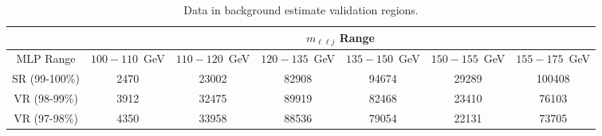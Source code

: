 \documentclass[NOTE, atlasdraft=true, texlive=2017, UKenglish]{\ATLASLATEXPATH atlasdoc}
\begin{document}

\begin{table}[!htbp]{\footnotesize\renewcommand{\arraystretch}{1.2}
    \begin{center}
      \begin{tabular}{c|c|c|c|c|c|c|}
        \cline{2-7}
        & \multicolumn{6}{|c|}{$m_{\ell\ell j}$ Range}\\
        \hline
        \multicolumn{1}{|c|}{MLP Range} & $100-110$~GeV & $110-120$~GeV & $120-135$~GeV & $135-150$~GeV & $150-155$~GeV & $155-175$~GeV \\
        \hline
        \multicolumn{1}{|c|}{SR (99-100\%)} & 2470 & 23002 & 82908 & 94674 & 29289 & 100408 \\
        \multicolumn{1}{|c|}{VR (98-99\%)} & 3912 & 32475 & 89919 & 82468 & 23410 & 76103 \\
        \multicolumn{1}{|c|}{VR (97-98\%)} & 4350 & 33958 & 88536 & 79054 & 22131 & 73705 \\
        \hline
      \end{tabular}
      \caption{Data in background estimate validation regions.}
      \label{tab:vrsdata}
  \end{center}}
\end{table}
\end{document}

